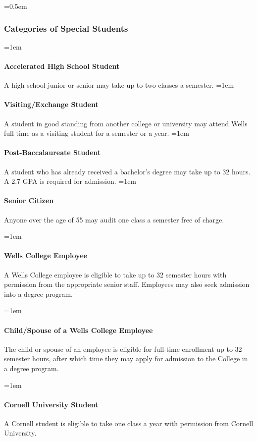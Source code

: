 \documentclass{manual}
\newcommand{\oldbreak}[1]{}
\let\oldsubsubsection\subsubsection
\renewcommand\subsubsection{\leftskip=0.5em\oldsubsubsection}
\let\oldparagraph\paragraph
\renewcommand\paragraph{\leftskip=1em\oldparagraph}
\begin{document}
\subsubsection{Categories of Special Students}\label{sub:CategoriesOfSpecialStudents}

\paragraph{Accelerated High School Student} A high school junior or senior may take up to two classes a semester.
\paragraph{Visiting/Exchange Student} A student in good standing from another college or university may attend Wells full time as a visiting student for a semester or a year.
\paragraph{Post-Baccalaureate Student} A student who has already received a bachelor's degree may take up to 32 hours. A 2.7 GPA is required for admission. 
\paragraph{Senior Citizen} Anyone over the age of 55 may audit one class a semester free of charge.

\oldbreak{X-1}

\paragraph{Wells College Employee}\label{par:employeeClasses} A Wells College employee is eligible to take up to 32 semester hours with permission from the appropriate senior staff. Employees may also seek admission into a degree program.

\paragraph{Child/Spouse of a Wells College Employee}\label{par:spouseClasses} The child or spouse of an employee is eligible for full-time enrollment up to 32 semester hours, after which time they may apply for admission to the College in a degree program.

\paragraph{Cornell University Student} A Cornell student is eligible to take one class a year with permission from Cornell University.
\end{document}
